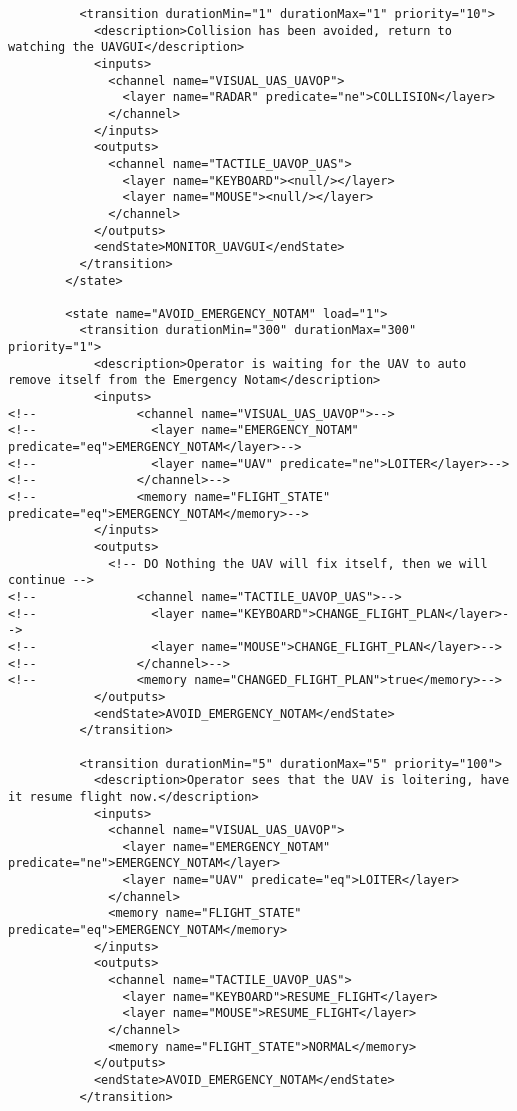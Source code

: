 \begin{verbatim}
          <transition durationMin="1" durationMax="1" priority="10">
            <description>Collision has been avoided, return to watching the UAVGUI</description>
            <inputs>
              <channel name="VISUAL_UAS_UAVOP">
                <layer name="RADAR" predicate="ne">COLLISION</layer>
              </channel>
            </inputs>
            <outputs>
              <channel name="TACTILE_UAVOP_UAS">
                <layer name="KEYBOARD"><null/></layer>
                <layer name="MOUSE"><null/></layer>
              </channel>
            </outputs>
            <endState>MONITOR_UAVGUI</endState>
          </transition>
        </state>
        
        <state name="AVOID_EMERGENCY_NOTAM" load="1">
          <transition durationMin="300" durationMax="300" priority="1">
            <description>Operator is waiting for the UAV to auto remove itself from the Emergency Notam</description>
            <inputs>
<!--              <channel name="VISUAL_UAS_UAVOP">-->
<!--                <layer name="EMERGENCY_NOTAM" predicate="eq">EMERGENCY_NOTAM</layer>-->
<!--                <layer name="UAV" predicate="ne">LOITER</layer>-->
<!--              </channel>-->
<!--              <memory name="FLIGHT_STATE" predicate="eq">EMERGENCY_NOTAM</memory>-->
            </inputs>
            <outputs>
              <!-- DO Nothing the UAV will fix itself, then we will continue -->
<!--              <channel name="TACTILE_UAVOP_UAS">-->
<!--                <layer name="KEYBOARD">CHANGE_FLIGHT_PLAN</layer>-->
<!--                <layer name="MOUSE">CHANGE_FLIGHT_PLAN</layer>-->
<!--              </channel>-->
<!--              <memory name="CHANGED_FLIGHT_PLAN">true</memory>-->
            </outputs>
            <endState>AVOID_EMERGENCY_NOTAM</endState>
          </transition>
          
          <transition durationMin="5" durationMax="5" priority="100">
            <description>Operator sees that the UAV is loitering, have it resume flight now.</description>
            <inputs>
              <channel name="VISUAL_UAS_UAVOP">
                <layer name="EMERGENCY_NOTAM" predicate="ne">EMERGENCY_NOTAM</layer>
                <layer name="UAV" predicate="eq">LOITER</layer>
              </channel>
              <memory name="FLIGHT_STATE" predicate="eq">EMERGENCY_NOTAM</memory>
            </inputs>
            <outputs>
              <channel name="TACTILE_UAVOP_UAS">
                <layer name="KEYBOARD">RESUME_FLIGHT</layer>
                <layer name="MOUSE">RESUME_FLIGHT</layer>
              </channel>
              <memory name="FLIGHT_STATE">NORMAL</memory>
            </outputs>
            <endState>AVOID_EMERGENCY_NOTAM</endState>
          </transition>
          

\end{verbatim}
